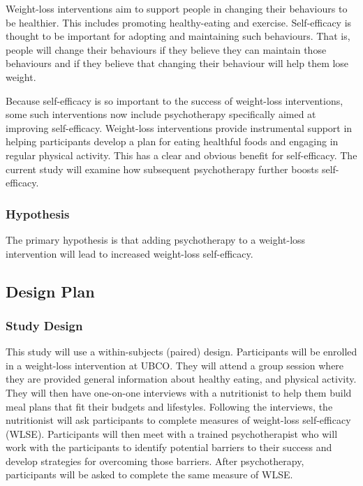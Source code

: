 \documentclass[
]{book}
\begin{document}
Weight-loss interventions aim to support people in changing their behaviours to be healthier. This includes promoting healthy-eating and exercise. Self-efficacy is thought to be important for adopting and maintaining such behaviours. That is, people will change their behaviours if they believe they can maintain those behaviours and if they believe that changing their behaviour will help them lose weight.

Because self-efficacy is so important to the success of weight-loss interventions, some such interventions now include psychotherapy specifically aimed at improving self-efficacy. Weight-loss interventions provide instrumental support in helping participants develop a plan for eating healthful foods and engaging in regular physical activity. This has a clear and obvious benefit for self-efficacy. The current study will examine how subsequent psychotherapy further boosts self-efficacy.

\hypertarget{hypothesis}{%
\subsubsection{Hypothesis}\label{hypothesis}}

The primary hypothesis is that adding psychotherapy to a weight-loss intervention will lead to increased weight-loss self-efficacy.

\hypertarget{design-plan}{%
\subsection{Design Plan}\label{design-plan}}

\hypertarget{study-design}{%
\subsubsection{Study Design}\label{study-design}}

This study will use a within-subjects (paired) design. Participants will be enrolled in a weight-loss intervention at UBCO. They will attend a group session where they are provided general information about healthy eating, and physical activity. They will then have one-on-one interviews with a nutritionist to help them build meal plans that fit their budgets and lifestyles. Following the interviews, the nutritionist will ask participants to complete measures of weight-loss self-efficacy (WLSE). Participants will then meet with a trained psychotherapist who will work with the participants to identify potential barriers to their success and develop strategies for overcoming those barriers. After psychotherapy, participants will be asked to complete the same measure of WLSE.
\end{document}
